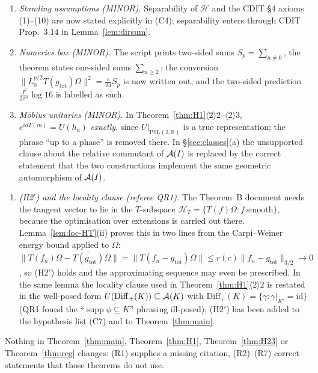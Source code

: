\documentclass[11pt]{article}
\newcommand{\Om}{\Omega}
\newcommand{\Hil}{\mathcal H}
\newcommand{\Diff}{\mathrm{Diff}_+}
\newcommand{\norm}[1]{\lVert #1\rVert}
\newcommand{\gtot}{g_{\mathrm{tot}}}
\newcommand{\supp}{\operatorname{supp}}
\begin{document}
\begin{enumerate}[leftmargin=1.8em,label=\textup{(R\arabic*)}]
corrected in Proposition~\ref{prop:energy}(iii).  Only the modulus was ever used.
\item \emph{Standing assumptions (MINOR).}  Separability of $\Hil$ and the CDIT \S4 axioms (1)--(10) are now stated
explicitly in (C4); separability enters through CDIT Prop.~3.14 in Lemma~\ref{lem:dirsum}.
\item \emph{Numerics box (MINOR).}  The script prints two-sided sums $S_p=\sum_{n\ne0}$, the theorem states
one-sided sums $\sum_{n\ge2}$; the conversion $\norm{L_0^{p/2}T(\gtot)\Om}^2=\frac c{24}S_p$ is now written out, and
the two-sided prediction $\frac{J^2}{2\pi^2}\log16$ is labelled as such.
\item \emph{M\"obius unitaries (MINOR).}  In Theorem~\ref{thm:H1}$\langle2\rangle2$--$\langle2\rangle3$,
$e^{iaT(m)}=U(h_a)$ \emph{exactly}, since $U|_{\mathrm{PSL}(2,\mathbb R)}$ is a true representation; the phrase
``up to a phase'' is removed there.  In \S\ref{sec:classes}(a) the unsupported clause about the relative commutant
of $\mathcal A(I)$ is replaced by the correct statement that the two constructions implement the same geometric
automorphism of $\mathcal A(I)$.
\end{enumerate}

\begin{enumerate}[leftmargin=1.8em,label=\textup{(R\arabic*)},start=8]
\item \emph{(H2$'$) and the locality clause (referee QR1).}  The Theorem~B document needs the tangent vector to lie
in the $T$-subspace $\Hil_T=\overline{\{T(f)\Om:f\ \text{smooth}\}}$, because the optimisation over extensions is
carried out there.  Lemma~\ref{lem:loc-HT}(ii) proves this in two lines from the Carpi--Weiner energy bound applied
to $\Om$: $\norm{T(f_n)\Om-\overline{T(\gtot)}\Om}=\norm{T(f_n-\gtot)\Om}\le r(c)\norm{f_n-\gtot}_{3/2}\to0$, so
(H2$'$) holds and the approximating sequence may even be prescribed.  In the same lemma the locality clause used in
Theorem~\ref{thm:H1}$\langle2\rangle2$ is restated in the well-posed form $U(\Diff(K))\subseteq\cA(K)$ with
$\Diff(K)=\{\gamma:\gamma|_{K'}=\mathrm{id}\}$ (QR1 found the ``$\supp\phi\subseteq K$'' phrasing ill-posed);
(H2$'$) has been added to the hypothesis list (C7) and to Theorem~\ref{thm:main}.
\end{enumerate}

Nothing in Theorem~\ref{thm:main}, Theorem~\ref{thm:H1}, Theorem~\ref{thm:H23} or Theorem~\ref{thm:reg} changes:
(R1) supplies a missing citation, (R2)--(R7) correct statements that those theorems do not use.
\end{document}
